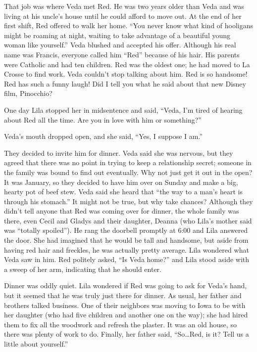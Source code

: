 \documentclass[
  letterpaper,
]{book}
\begin{document}
That job was where Veda met Red. He was two years older than Veda and
was living at his uncle's house until he could afford to move out. At
the end of her first shift, Red offered to walk her home. ``You never
know what kind of hooligans might be roaming at night, waiting to take
advantage of a beautiful young woman like yourself.'' Veda blushed and
accepted his offer. Although his real name was Francis, everyone called
him ``Red'' because of his hair. His parents were Catholic and had ten
children. Red was the oldest one; he had moved to La Crosse to find
work. Veda couldn't stop talking about him. Red is so handsome! Red has
such a funny laugh! Did I tell you what he said about that new Disney
film, Pinocchio?

One day Lila stopped her in midsentence and said, ``Veda, I'm tired of
hearing about Red all the time. Are you in love with him or something?''

Veda's mouth dropped open, and she said, ``Yes, I suppose I am.''

They decided to invite him for dinner. Veda said she was nervous, but
they agreed that there was no point in trying to keep a relationship
secret; someone in the family was bound to find out eventually. Why not
just get it out in the open? It was January, so they decided to have him
over on Sunday and make a big, hearty pot of beef stew. Veda said she
heard that ``the way to a man's heart is through his stomach.'' It might
not be true, but why take chances? Although they didn't tell anyone that
Red was coming over for dinner, the whole family was there, even Cecil
and Gladys and their daughter, Deanna (who Lila's mother said was
``totally spoiled''). He rang the doorbell promptly at 6:00 and Lila
answered the door. She had imagined that he would be tall and handsome,
but aside from having red hair and freckles, he was actually pretty
average. Lila wondered what Veda saw in him. Red politely asked, ``Is
Veda home?'' and Lila stood aside with a sweep of her arm, indicating
that he should enter.

Dinner was oddly quiet. Lila wondered if Red was going to ask for Veda's
hand, but it seemed that he was truly just there for dinner. As usual,
her father and brothers talked business. One of their neighbors was
moving to Iowa to be with her daughter (who had five children and
another one on the way); she had hired them to fix all the woodwork and
refresh the plaster. It was an old house, so there was plenty of work to
do. Finally, her father said, ``So\ldots Red, is it? Tell us a little
about yourself.''
\end{document}
